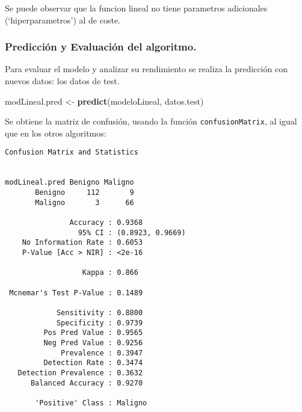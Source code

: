 \documentclass[
]{article}
\newenvironment{Shaded}{\begin{snugshade}}{\end{snugshade}}
\newcommand{\CommentTok}[1]{\textcolor[rgb]{0.56,0.35,0.01}{\textit{#1}}}
\newcommand{\DataTypeTok}[1]{\textcolor[rgb]{0.13,0.29,0.53}{#1}}
\newcommand{\KeywordTok}[1]{\textcolor[rgb]{0.13,0.29,0.53}{\textbf{#1}}}
\newcommand{\NormalTok}[1]{#1}
\newcommand{\OperatorTok}[1]{\textcolor[rgb]{0.81,0.36,0.00}{\textbf{#1}}}
\newcommand{\StringTok}[1]{\textcolor[rgb]{0.31,0.60,0.02}{#1}}
\begin{document}
Se puede observar que la funcion lineal no tiene parametros adicionales
(`hiperparametros') al de coste.

\hypertarget{predicciuxf3n-y-evaluaciuxf3n-del-algoritmo.}{%
\subsubsection{Predicción y Evaluación del
algoritmo.}\label{predicciuxf3n-y-evaluaciuxf3n-del-algoritmo.}}

Para evaluar el modelo y analizar su rendimiento se realiza la
predicción con nuevos datos: los datos de test.

\begin{Shaded}
\begin{Highlighting}[]
\NormalTok{modLineal.pred <-}\StringTok{ }\KeywordTok{predict}\NormalTok{(modeloLineal, datos.test)}
\end{Highlighting}
\end{Shaded}

Se obtiene la matriz de confusión, usando la función
\texttt{confusionMatrix}, al igual que en los otros algoritmos:

\begin{Shaded}
\end{Shaded}

\begin{verbatim}
Confusion Matrix and Statistics

              
modLineal.pred Benigno Maligno
       Benigno     112       9
       Maligno       3      66
                                          
               Accuracy : 0.9368          
                 95% CI : (0.8923, 0.9669)
    No Information Rate : 0.6053          
    P-Value [Acc > NIR] : <2e-16          
                                          
                  Kappa : 0.866           
                                          
 Mcnemar's Test P-Value : 0.1489          
                                          
            Sensitivity : 0.8800          
            Specificity : 0.9739          
         Pos Pred Value : 0.9565          
         Neg Pred Value : 0.9256          
             Prevalence : 0.3947          
         Detection Rate : 0.3474          
   Detection Prevalence : 0.3632          
      Balanced Accuracy : 0.9270          
                                          
       'Positive' Class : Maligno         
                                          
\end{verbatim}
\end{document}
